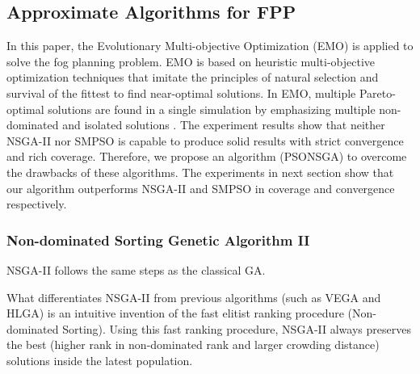 \documentclass[10pt,journal,compsoc]{IEEEtran}
\begin{document}

\subsection{Approximate Algorithms for FPP}\label{sec:approximate}
In this paper, the Evolutionary Multi-objective Optimization (EMO) is applied to solve the fog planning problem. EMO is based on heuristic multi-objective optimization techniques that imitate the principles of natural selection and survival of the fittest to find near-optimal solutions. In EMO, multiple Pareto-optimal solutions are found in a single simulation by emphasizing multiple non-dominated and isolated solutions \cite{Deb:2001:MOU:559152}. %
The experiment results show that neither NSGA-II nor SMPSO is capable to produce solid results with strict convergence and rich coverage. Therefore, we propose an algorithm (PSONSGA) to overcome the drawbacks of these algorithms. The experiments in next section show that our algorithm outperforms NSGA-II and SMPSO in coverage and convergence respectively.
\subsubsection{Non-dominated Sorting Genetic Algorithm II}
NSGA-II follows the same steps as the classical GA. 

What differentiates NSGA-II from previous algorithms (such as VEGA and HLGA) is an intuitive invention of the fast elitist ranking procedure (Non-dominated Sorting). Using this fast ranking procedure, NSGA-II always preserves the best (higher rank in non-dominated rank and larger crowding distance) solutions inside the latest population. 

\end{document}
